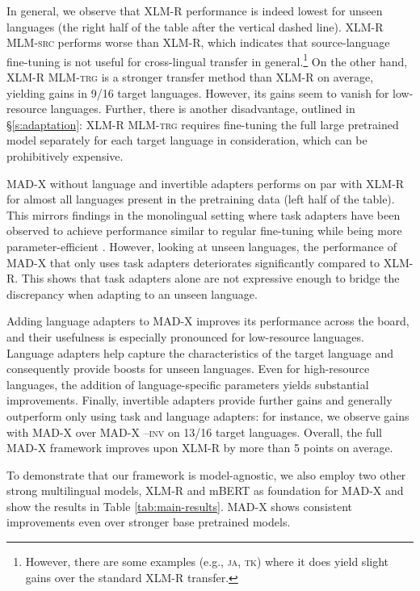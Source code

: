 \documentclass[11pt,a4paper]{article}
\newcommand{\model}[1]{\textsc{MAD-X}}
\newcommand{\xlmr}[1]{\textsc{XLM-R}}
\newcommand{\mlmsrc}[1]{\textsc{XLM-R MLM-src}}
\newcommand{\mlmtrg}[1]{\textsc{XLM-R MLM-trg}}
\begin{document}
In general, we observe that \xlmr{} performance is indeed lowest for unseen languages (the right half of the table after the vertical dashed line). \mlmsrc{} performs worse than \xlmr{}, which indicates that source-language fine-tuning is not useful for cross-lingual transfer in general.\footnote{However, there are some examples (e.g., \textsc{ja}, \textsc{tk}) where it does yield slight gains over the standard \xlmr{} transfer.} On the other hand, \mlmtrg{} is a stronger transfer method than \xlmr{} on average, yielding gains in 9/16 target languages. However, its gains seem to vanish for low-resource languages. Further, there is another disadvantage, outlined in \S\ref{s:adaptation}: \mlmtrg{} requires fine-tuning the full large pretrained model separately for each target language in consideration, which can be prohibitively expensive.

  

\model{} without language and invertible adapters performs on par with \xlmr{} for almost all languages present in the pretraining data (left half of the table). This mirrors findings in the monolingual setting where task adapters have been observed to achieve performance similar to regular fine-tuning while being more parameter-efficient \cite{Houlsby2019adapters}. However, looking at unseen languages, the performance of \model{} that only uses task adapters deteriorates significantly compared to \xlmr{}. This shows that task adapters alone are not expressive enough to bridge the discrepancy when adapting to an unseen language.

Adding language adapters to \model{} improves its performance across the board, and their usefulness is especially pronounced for low-resource languages. Language adapters help capture the characteristics of the target language and consequently provide boosts for unseen languages. Even for high-resource languages, the addition of language-specific parameters yields substantial improvements. Finally, invertible adapters provide further gains and generally outperform only using task and language adapters: for instance, we observe gains with \model{} over \model{} \textsc{--inv} on 13/16 target languages. Overall, the full \model{} framework improves upon \xlmr{} by more than 5  points on average.

To demonstrate that our framework is model-agnostic, we also employ two other strong multilingual models, XLM-R and mBERT as foundation for \model{} and show the results in Table \ref{tab:main-results}. \model{} shows consistent improvements even over stronger base pretrained models.
\end{document}
